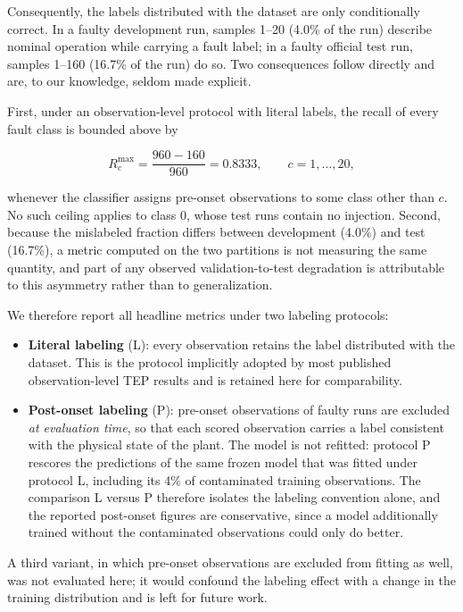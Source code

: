 \documentclass[12pt,a4paper]{article}
\begin{document}
Consequently, the labels distributed with the dataset are only conditionally
correct. In a faulty development run, samples 1--20 (4.0\% of the run) describe
nominal operation while carrying a fault label; in a faulty official test run,
samples 1--160 (16.7\% of the run) do so. Two consequences follow directly and
are, to our knowledge, seldom made explicit.

First, under an observation-level protocol with literal labels, the recall of
every fault class is bounded above by

\begin{equation}
R^{\max}_c=\frac{960-160}{960}=0.8333,\qquad c=1,\dots,20,
\label{eq:ceiling}
\end{equation}

whenever the classifier assigns pre-onset observations to some class other than
$c$. No such ceiling applies to class 0, whose test runs contain no injection.
Second, because the mislabeled fraction differs between development (4.0\%) and
test (16.7\%), a metric computed on the two partitions is not measuring the
same quantity, and part of any observed validation-to-test degradation is
attributable to this asymmetry rather than to generalization.

We therefore report all headline metrics under two labeling protocols:

\begin{itemize}
  \item \textbf{Literal labeling} (L): every observation retains the label
  distributed with the dataset. This is the protocol implicitly adopted by most
  published observation-level TEP results and is retained here for
  comparability.
  \item \textbf{Post-onset labeling} (P): pre-onset observations of faulty runs
  are excluded \emph{at evaluation time}, so that each scored observation
  carries a label consistent with the physical state of the plant. The model is
  not refitted: protocol P rescores the predictions of the same frozen model
  that was fitted under protocol L, including its 4\% of contaminated training
  observations. The comparison L versus P therefore isolates the labeling
  convention alone, and the reported post-onset figures are conservative, since
  a model additionally trained without the contaminated observations could only
  do better.
\end{itemize}

A third variant, in which pre-onset observations are excluded from fitting as
well, was not evaluated here; it would confound the labeling effect with a
change in the training distribution and is left for future work.
\end{document}

